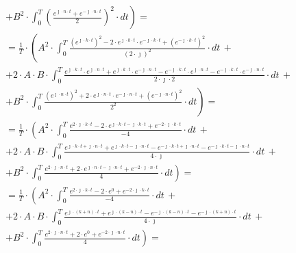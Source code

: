 \begin{task}
\begin{align*}
&+ \left. B^2 \cdot \int_{0}^{T} \left(\frac{e^{\jmath \cdot n \cdot t}+e^{-\jmath \cdot n \cdot t}}{2}\right)^2 \cdot dt \right)=\\
&=\frac{1}{T} \cdot \left( A^2\cdot \int_{0}^{T} \frac{\left(e^{\jmath \cdot k \cdot t}\right)^2-2\cdot e^{\jmath \cdot k \cdot t} \cdot e^{-\jmath \cdot k \cdot t} +\left(e^{-\jmath \cdot k \cdot t}\right)^2}{\left(2\cdot \jmath\right)^2}\cdot dt \,+\right. \\
&+ \left. 2 \cdot A\cdot B \cdot \int_{0}^{T} \frac{e^{\jmath \cdot k \cdot t} \cdot e^{\jmath \cdot n \cdot t} + e^{\jmath \cdot k \cdot t} \cdot e^{-\jmath \cdot n \cdot t} - e^{-\jmath \cdot k \cdot t}\cdot e^{\jmath \cdot n \cdot t} - e^{-\jmath \cdot k \cdot t}\cdot e^{-\jmath \cdot n \cdot t}}{2\cdot \jmath \cdot 2} \cdot dt\,+\right.\\
&+ \left. B^2 \cdot \int_{0}^{T} \frac{\left(e^{\jmath \cdot n \cdot t}\right)^2+2\cdot e^{\jmath \cdot n \cdot t} \cdot e^{-\jmath \cdot n \cdot t} +\left(e^{-\jmath \cdot n \cdot t}\right)^2}{2^2} \cdot dt \right)=\\
&=\frac{1}{T} \cdot \left( A^2\cdot \int_{0}^{T} \frac{e^{2\cdot \jmath \cdot k \cdot t}-2\cdot e^{\jmath \cdot k \cdot t-\jmath \cdot k \cdot t} +e^{-2\cdot \jmath \cdot k \cdot t}}{-4}\cdot dt \,+\right. \\
&+ \left. 2 \cdot A\cdot B \cdot \int_{0}^{T} \frac{e^{\jmath \cdot k \cdot t+\jmath \cdot n \cdot t} + e^{\jmath \cdot k \cdot t -\jmath \cdot n \cdot t} - e^{-\jmath \cdot k \cdot t+\jmath \cdot n \cdot t} - e^{-\jmath \cdot k \cdot t-\jmath \cdot n \cdot t}}{4\cdot \jmath} \cdot dt\,+\right.\\
&+ \left. B^2 \cdot \int_{0}^{T} \frac{e^{2\cdot \jmath \cdot n \cdot t}+2\cdot e^{\jmath \cdot n \cdot t -\jmath \cdot n \cdot t} +e^{-2\cdot \jmath \cdot n \cdot t}}{4} \cdot dt \right)=\\
&=\frac{1}{T} \cdot \left( A^2\cdot \int_{0}^{T} \frac{e^{2\cdot \jmath \cdot k \cdot t}-2\cdot e^{0} +e^{-2\cdot \jmath \cdot k \cdot t}}{-4}\cdot dt \,+\right. \\
&+ \left. 2 \cdot A\cdot B \cdot \int_{0}^{T} \frac{e^{\jmath \cdot \left(k+n\right) \cdot t} + e^{\jmath \cdot \left(k-n\right) \cdot t} - e^{-\jmath \cdot \left(k-n\right) \cdot t} - e^{-\jmath \cdot \left(k+n\right) \cdot t}}{4\cdot \jmath} \cdot dt\,+\right.\\
&+ \left. B^2 \cdot \int_{0}^{T} \frac{e^{2\cdot \jmath \cdot n \cdot t}+2\cdot e^{0} +e^{-2\cdot \jmath \cdot n \cdot t}}{4} \cdot dt \right)=\\

\end{align*}
\end{task}
